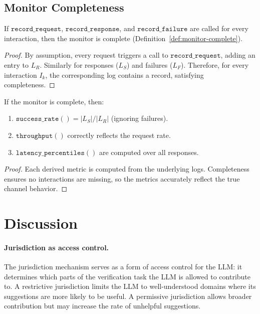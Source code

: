 \documentclass[11pt]{article}
\begin{document}
\subsection{Monitor Completeness}
\label{sec:formal:monitor}

\begin{theorem}
\label{thm:monitor}
If $\texttt{record\_request}$, $\texttt{record\_response}$, and
$\texttt{record\_failure}$ are called for every interaction, then
the monitor is complete (Definition~\ref{def:monitor-complete}).
\end{theorem}

\begin{proof}
By assumption, every request triggers a call to
$\texttt{record\_request}$, adding an entry to $L_R$.
Similarly for responses ($L_S$) and failures ($L_F$).
Therefore, for every interaction $I_k$, the corresponding log
contains a record, satisfying completeness.
\end{proof}

\begin{corollary}
\label{cor:metrics-accurate}
If the monitor is complete, then:
\begin{enumerate}
\item $\texttt{success\_rate}() = |L_S| / |L_R|$ (ignoring failures).
\item $\texttt{throughput}()$ correctly reflects the request rate.
\item $\texttt{latency\_percentiles}()$ are computed over all responses.
\end{enumerate}
\end{corollary}

\begin{proof}
Each derived metric is computed from the underlying logs.
Completeness ensures no interactions are missing, so the
metrics accurately reflect the true channel behavior.
\end{proof}

\section{Discussion}
\label{sec:discussion}

\paragraph{Jurisdiction as access control.}
The jurisdiction mechanism serves as a form of access control
for the LLM: it determines which parts of the verification
task the LLM is allowed to contribute to.  A restrictive
jurisdiction limits the LLM to well-understood domains where
its suggestions are more likely to be useful.  A permissive
jurisdiction allows broader contribution but may increase
the rate of unhelpful suggestions.
\end{document}
